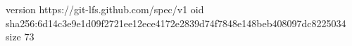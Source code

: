 version https://git-lfs.github.com/spec/v1
oid sha256:6d14c3e9e1d09f2721ee12ece4172e2839d74f7848e148beb408097dc8225034
size 73

